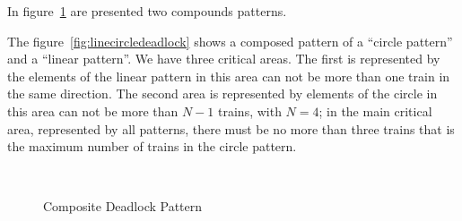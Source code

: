 \documentclass{ewic}
\begin{document}
			In figure~\ref{fig:compdeadlockpattern} are presented two compounds patterns.
			
			
			The figure~\ref{fig:linecircledeadlock}  shows a composed pattern of a ``circle pattern'' and a ``linear pattern''. We have three critical areas. The first is represented by the elements of the linear pattern in this area can not be more than one train in the same direction.  The second area is represented by elements of the circle in this area can not be more than $N-1$ trains, with $N=4$; in the main critical area, represented by all patterns,  there must be no more than three trains that is the maximum number of trains in the circle pattern.
			
			\begin{figure}[!htp]
			 \centering
			
			 
			 \\
			
			\caption{Composite Deadlock Pattern}
			 \label{fig:compdeadlockpattern}
			 \end{figure}
			
\end{document}
